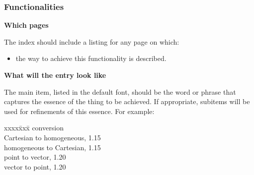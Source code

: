 \documentclass[11pt]{article}
\newenvironment{indexex}{\begin{tabbing}
xxxx\=xxx\=\kill}{\end{tabbing}}
\begin{document}
\subsubsection{Functionalities}%
\label{functionalities}

\begin{description}
   \item{\bf Which pages} 

         The index should include a listing for any page on which:
           \begin{itemize}
               \item the way to achieve this functionality is described.
           \end{itemize}
   \item{\bf What will the entry look like}

        The main item, listed in the default font, should be the word 
        or phrase that captures the
        essence of the thing to be achieved.  If appropriate, subitems 
        will be used for refinements of this essence. For example:
        \begin{indexex}
        conversion  \\
        \> Cartesian to homogeneous,      1.15 \\
        \> homogeneous to Cartesian,      1.15 \\
        \> point to vector,               1.20 \\
        \> vector to point,               1.20 \\
        \end{indexex}


\end{description}
\end{document}
